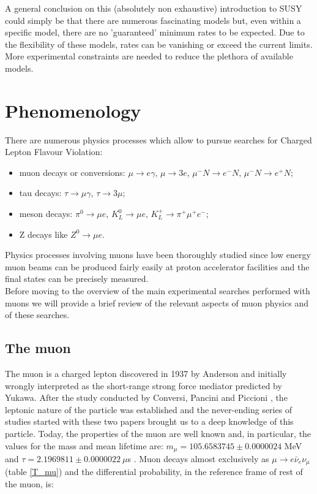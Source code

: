 \documentclass[12pt,a4paper,openright, oneside, titlepage]{book} %
\begin{document}
\noindent A general conclusion on this (absolutely non exhaustive) introduction to SUSY could simply be that there are numerous fascinating models but, even within a specific model, there are no 'guaranteed' minimum rates to be expected. 
Due to the flexibility of these models, rates can be vanishing or exceed the current limits.
More experimental constraints are needed to reduce the plethora of available models.

\section{Phenomenology}
There are numerous physics processes which allow to pursue searches for Charged Lepton Flavour Violation:
\begin{itemize}
\item muon decays or conversions: 
$\mu\rightarrow e \gamma$, $\mu\rightarrow 3e$, $\mu^- N\rightarrow e^- N$, $\mu^- N\rightarrow e^+ N$; 
\item tau decays: $\tau\rightarrow \mu \gamma$, $\tau\rightarrow 3\mu$;
\item meson decays: $\pi^0\rightarrow \mu e$, $K_L^0\rightarrow\mu e$, $K_L^+\rightarrow \pi^+ \mu^+ e^-$;
\item Z decays like $Z^0\rightarrow\mu e$.
\end{itemize}
Physics processes involving muons have been thoroughly studied since low energy muon beams can be produced fairly easily at proton accelerator facilities and the final states can be precisely measured.\\
Before moving to the overview of the main experimental searches performed with muons we will provide a brief review of the relevant aspects of muon physics and of these searches.

\subsection{The muon}
\label{muon}
The muon is a charged lepton discovered in 1937 by Anderson \cite{Anderson} and initially wrongly interpreted as the short-range strong force mediator predicted by Yukawa. 
After the study conducted by Conversi, Pancini and Piccioni \cite{ConvPancPicc}, the leptonic nature of the particle was established and the never-ending series of studies started with these two papers brought us to a deep knowledge of this particle. 
Today, the properties of the muon are well known and, in particular, the values for the mass and  mean lifetime are: $m_\mu = 105.6583745 \pm 0.0000024 $ MeV and $\tau =  2.1969811 \pm 0.0000022 \ \mu$s \cite{PDG}.
Muon decays almost exclusively as $\mu\rightarrow e\bar{\nu}_e\nu_{\mu}$ (table \ref{T_mu}) and the differential probability, in the reference frame of rest of the muon, is:
\end{document}
